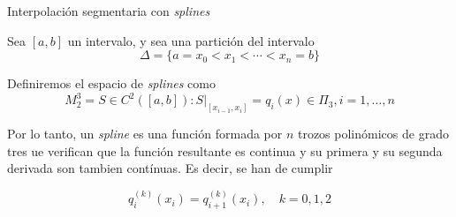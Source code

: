 \begin{frame}{Interpolación segmentaria con \textit{splines}}
    
    Sea $[a, b]$ un intervalo, y sea una partición del intervalo
    \[\Delta = \{a = x_0 < x_1 < \cdots < x_n = b\}\]
    
    Definiremos el espacio de \textit{splines} como
    \[M_2^3 = {S \in C^2([a, b]) : S|_[x_{i-1}, x_ i] = q_ i(x) \in \Pi_3, i = 1,\dots, n}\]


    Por lo tanto, un \textit{spline} es una función formada por $n$ trozos polinómicos 
    de grado tres ue verifican que la función resultante es continua y su primera y su segunda derivada son tambien contínuas.
    Es decir, se han de cumplir

    \[
        q_i^{(k)}(x_i) = q_{i+1}^(k)(x_i), \quad k = 0, 1, 2    
    \]
\end{frame}